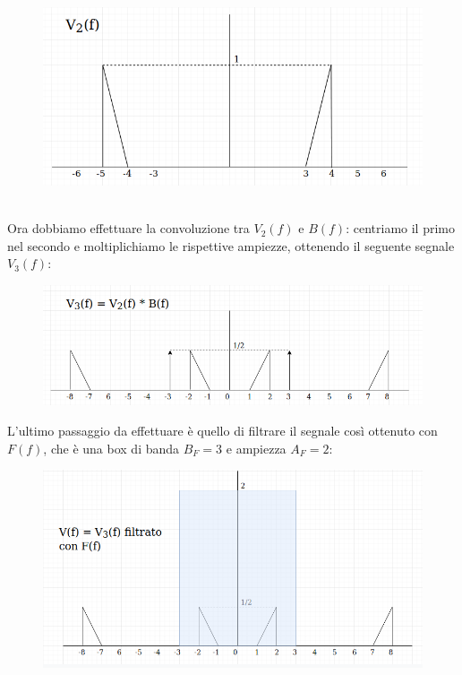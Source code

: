 \documentclass[12pt,a4paper]{article}
\begin{document}
	\begin{figure}[h!]
		\centering
		\includegraphics[scale=0.3]{./images/fourier35.png}
	\end{figure}
	\\ Ora dobbiamo effettuare la convoluzione tra $V_2(f)$ e $B(f)$: centriamo il primo nel secondo e moltiplichiamo le rispettive ampiezze, ottenendo il seguente segnale $V_3(f)$:
	\begin{figure}[h!]
		\centering
		\includegraphics[scale=0.4]{./images/fourier36.png}
	\end{figure}
	\newpage
	L'ultimo passaggio da effettuare è quello di filtrare il segnale così ottenuto con $F(f)$, che è una box di banda $B_F = 3$ e ampiezza $A_F = 2$:
	\begin{figure}[h!]
		\centering
		\includegraphics[scale=0.4]{./images/fourier37.png}
	\end{figure}
\end{document}
